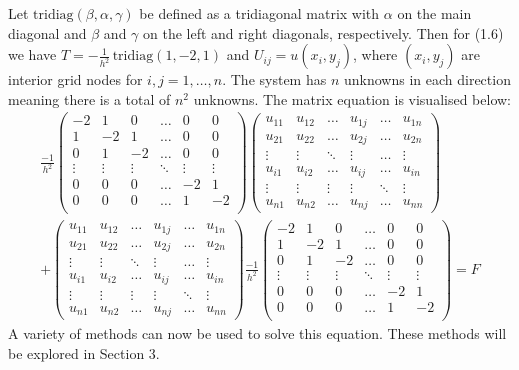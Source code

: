 \documentclass[11pt]{article}
\numberwithin{equation}{section}
\begin{document}
Let $\text{tridiag}(\beta,\alpha,\gamma)$ be defined as a tridiagonal matrix with $\alpha$ on the main diagonal and $\beta$ and $\gamma$ on the left and right diagonals, respectively. Then for (1.6) we have $T=-\frac{1}{h^2} \, \text{tridiag}(1,-2,1)$ and $U_{ij} = u(x_i, y_j)$, where $(x_i, y_j)$ are interior grid nodes for $i,j=1,\dots,n$. The system has $n$ unknowns in each direction meaning there is a total of $n^2$ unknowns. The matrix equation is visualised below:
\begin{eqnarray}
\frac{-1}{h^2} 
\begin{pmatrix}
-2 & 1 & 0 & \dots & 0 & 0 \\
1 & -2 & 1 & \dots & 0 & 0 \\
0 & 1 & -2 & \dots & 0 & 0 \\
\vdots & \vdots & \vdots & \ddots & \vdots & \vdots \\
0 & 0 & 0 & \dots & -2 & 1 \\
0 & 0 & 0 & \dots & 1 & -2 \\
\end{pmatrix}
\begin{pmatrix}
u_{11} & u_{12} & \dots & u_{1j} & \dots & u_{1n} \\
u_{21} & u_{22} & \dots & u_{2j} & \dots & u_{2n} \\
\vdots & \vdots & \ddots & \vdots & \dots & \vdots \\
u_{i1} & u_{i2} & \dots & u_{ij} & \dots & u_{in} \\
\vdots & \vdots & \vdots & \vdots & \ddots & \vdots \\
u_{n1} & u_{n2} & \dots & u_{nj} & \dots & u_{nn}
\end{pmatrix} \nonumber \\ \nonumber
+
\begin{pmatrix}
u_{11} & u_{12} & \dots & u_{1j} & \dots & u_{1n} \\
u_{21} & u_{22} & \dots & u_{2j} & \dots & u_{2n} \\
\vdots & \vdots & \ddots & \vdots & \dots & \vdots \\
u_{i1} & u_{i2} & \dots & u_{ij} & \dots & u_{in} \\
\vdots & \vdots & \vdots & \vdots & \ddots & \vdots \\
u_{n1} & u_{n2} & \dots & u_{nj} & \dots & u_{nn}
\end{pmatrix}
\frac{-1}{h^2} 
\begin{pmatrix}
-2 & 1 & 0 & \dots & 0 & 0 \\
1 & -2 & 1 & \dots & 0 & 0 \\
0 & 1 & -2 & \dots & 0 & 0 \\
\vdots & \vdots & \vdots & \ddots & \vdots & \vdots \\
0 & 0 & 0 & \dots & -2 & 1 \\
0 & 0 & 0 & \dots & 1 & -2 \\
\end{pmatrix}
= F
\end{eqnarray}
A variety of methods can now be used to solve this equation. These methods will be explored in Section 3. 
\end{document}
